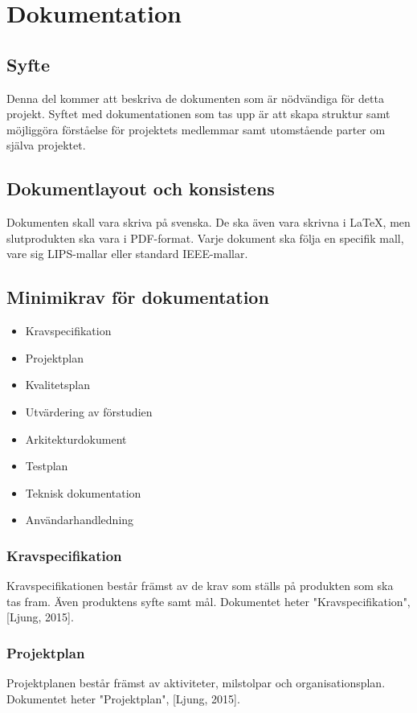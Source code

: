 \section{Dokumentation}

\subsection{Syfte}
Denna del kommer att beskriva de dokumenten som är nödvändiga för detta projekt. Syftet med dokumentationen som tas upp är att skapa struktur samt möjliggöra förståelse för projektets medlemmar samt utomstående parter om själva projektet.

\subsection{Dokumentlayout och konsistens}
Dokumenten skall vara skriva på svenska. De ska även vara skrivna i \LaTeX, men slutprodukten ska vara i PDF-format. Varje dokument ska följa en specifik mall, vare sig LIPS-mallar eller standard IEEE-mallar. 

\subsection{Minimikrav för dokumentation}
\begin{itemize}
\item Kravspecifikation
\item Projektplan
\item Kvalitetsplan
\item Utvärdering av förstudien
\item Arkitekturdokument
\item Testplan
\item Teknisk dokumentation
\item Användarhandledning
\end{itemize}

\subsubsection{Kravspecifikation}
Kravspecifikationen består främst av de krav som ställs på produkten som ska tas fram. Även produktens syfte samt mål. Dokumentet heter "Kravspecifikation", [Ljung, 2015].

\subsubsection{Projektplan}
Projektplanen består främst av aktiviteter, milstolpar och organisationsplan. Dokumentet heter "Projektplan", [Ljung, 2015].

